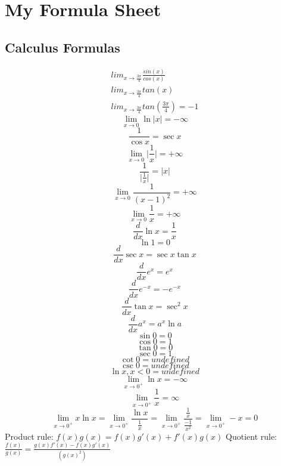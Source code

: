 \documentclass{article}
\begin{document}
\section*{My Formula Sheet}

\subsection*{Calculus Formulas}
\begin{align}
   lim_{x \to \frac{3\pi}{4}} \frac{sin(x)}{cos(x)}\\
   lim_{x \to \frac{3\pi}{4}} tan(x)\\
   lim_{x \to \frac{3\pi}{4}} tan(\frac{3\pi}{4}) = -1
\end{align}
\[\lim_{x \to 0} \ln{ \lvert x \rvert} = -\infty \]
\[\frac{1}{\cos{x}} = \sec{x}\]
\[\lim_{x \to 0} \lvert \frac{1}{x} \rvert = +\infty \]
\[\frac{1}{\lvert \frac{1}{x} \rvert} = \lvert x \rvert\]
\[\lim_{x \to 0}\frac{1}{(x-1)^2}=+\infty\]
\[\lim_{x \to 0}\frac{1}{x}=+\infty\]
\[\frac{d}{dx} \ln{x} = \frac{1}{x}\]
\[\ln{1} = 0\]
\[\frac{d}{dx} \sec{x} = \sec{x} \tan{x}\]
\[\frac{d}{dx} e^x = e^x\]
\[\frac{d}{dx} e^{-x} = -e^{-x}\]
\[\frac{d}{dx} \tan{x} = \sec^2{x}\]
\[\frac{d}{dx} a^x = a^x \ln{a}\]
\[\sin{0} = 0\]
\[\cos{0} = 1\]
\[\tan{0} = 0\]
\[\sec{0} = 1\]
\[\cot{0} = undefined\]
\[\csc{0} = undefined\]
\[\ln{x}, x<0 = undefined\]
\[\lim_{x \to 0^+} \ln{x} = -\infty\]
\[\lim_{x \to 0^+} \frac{1}{x} = \infty\]
\[\lim_{x \to 0^+} x \ln{x} = \lim_{x \to 0^+} \frac{\ln{x}}{\frac{1}{x}} = \lim_{x \to 0^+} \frac{\frac{1}{x}}{\frac{-1}{x^2}} = \lim_{x \to 0^+} -x = 0\]
Product rule: \(f(x)g(x) = f(x)g'(x)+f'(x)g(x)\)
Quotient rule: \(\frac{f(x)}{g(x)} = \frac{g(x)f'(x)-f(x)g'(x)}{(g(x)^2)}\)
\end{document}
